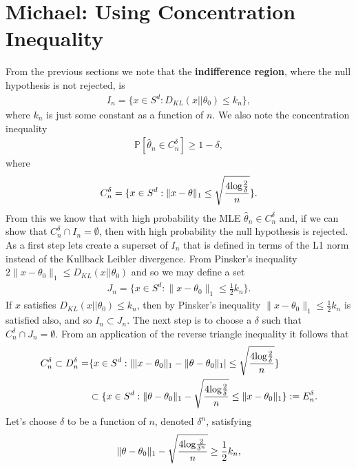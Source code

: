 \documentclass[11pt]{article}
\def\log{{\rm log}}
\begin{document}
\section{Michael: Using Concentration Inequality}
From the previous sections we note that the \textbf{indifference region}, where
the null hypothesis is not rejected, is
\begin{align}
  I_n = \lbrace x \in S^d : D_{KL}(x||\theta_0) \leq k_n \rbrace,
\end{align}
where $k_n$ is just some constant as a function of $n$. We also note the concentration inequality
\begin{align}
  \mathbb{P}[\hat{\theta}_n \in C_n^{\delta}] \geq 1-\delta,
\end{align}
where
\begin{align}
  C_n^{\delta}=\lbrace x \in S^d : \|x-\theta\|_1 \leq \sqrt{\frac{4\log \frac{2}{\delta}}{n}}\rbrace.
\end{align}
From this we know that with high probability the MLE $\hat{\theta}_n \in C_n^{\delta}$ and, if we can show that $C_n^{\delta} \cap I_n = \emptyset$, then with high probability the null hypothesis is rejected. As a first step lets create a superset of $I_n$ that is defined in terms of the L1 norm instead of the Kullback Leibler divergence. From Pinsker's inequality $2\|x-\theta_0\|_1 \leq D_{KL}(x||\theta_0)$ and so we may define a set
\begin{align}
  J_n = \lbrace x \in S^d : \|x-\theta_0\|_1 \leq \frac{1}{2}k_n \rbrace.
\end{align}
If $x$ satisfies $D_{KL}(x||\theta_0) \leq k_n$, then by Pinsker's inequality $\|x-\theta_0\|_1 \leq \frac{1}{2}k_n$ is satisfied also, and so $I_n \subset J_n$. The next step is to choose a $\delta$ such that $C_n^\delta \cap  J_n = \emptyset$. From an application of the reverse triangle inequality it follows that
\begin{align*}
  C_n^\delta \subset D_n^\delta =& \lbrace x \in S^d : |\|x-\theta_0\|_1 - \|\theta-\theta_0\|_1 | \leq \sqrt{\frac{4\log \frac{2}{\delta}}{n}}\rbrace\\
  &\subset \lbrace x \in S^d : \|\theta-\theta_0\|_1  - \sqrt{\frac{4\log \frac{2}{\delta}}{n}} \leq  \|x-\theta_0\|_1  \rbrace := E_n^{\delta}.
\end{align*}
Let's choose $\delta$ to be a function of $n$, denoted $\delta^n$, satisfying
\begin{align}
  \|\theta-\theta_0\|_1 - \sqrt{\frac{4\log \frac{2}{\delta^n}}{n}}\geq \frac{1}{2} k_n,
\end{align}
\end{document}
